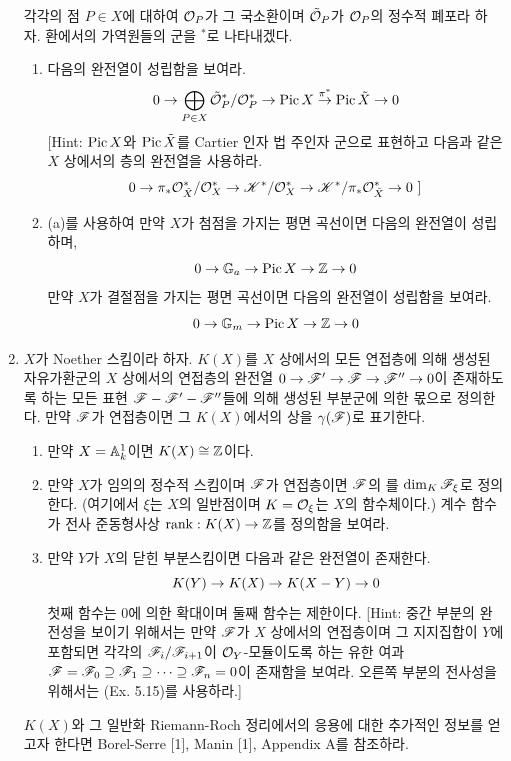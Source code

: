 \begin{enumerate}[label=\tb{6.\arabic*.},itemindent=0mm,itemsep=4mm]
{	각각의 점 $P\in X$에 대하여 $\mathcal{O}_P$가 그 국소환이며 $\tilde{\mathcal{O}}_P$가 $\mathcal{O}_P$의 정수적 폐포라 하자.
	환에서의 가역원들의 군을 ${}^*$로 나타내겠다.
	\begin{enumerate}[label=(\alph*)]
	\item 다음의 완전열이 성립함을 보여라.
	$$0\rightarrow\bigoplus_{P\in X}\tilde{\mathcal{O}}_P^*/\mathcal{O}_P^*\rightarrow\operatorname{Pic} X\stackrel{\pi^*}{\rightarrow}\operatorname{Pic}\tilde X\rightarrow 0$$
	[Hint: $\operatorname{Pic} X$와 $\operatorname{Pic}\tilde X$를 Cartier 인자 법 주인자 군으로 표현하고 다음과 같은 $X$ 상에서의 층의 완전열을 사용하라.
	$$0\rightarrow\pi_*\mathcal{O}_{\tilde X}^*/\mathcal{O}_X^*\rightarrow\mathscr{K}^*/\mathcal{O}_X^*\rightarrow\mathscr{K}^*/\pi_*\mathcal{O}_{\tilde X}^*\rightarrow 0\text{ ]}$$
	\item (a)를 사용하여 만약 $X$가 첨점을 가지는 평면 곡선이면 다음의 완전열이 성립하며,
	$$0\rightarrow\mathbb{G}_a\rightarrow\operatorname{Pic} X\rightarrow\mathbb Z\rightarrow 0$$
	만약 $X$가 결절점을 가지는 평면 곡선이면 다음의 완전열이 성립함을 보여라.
	$$0\rightarrow\mathbb{G}_m\rightarrow\operatorname{Pic} X\rightarrow\mathbb Z\rightarrow 0$$
	\end{enumerate}}
	\item {} $X$가 Noether 스킴이라 하자. $K(X)$를 $X$ 상에서의 모든 연접층에 의해 생성된 자유가환군의
	$X$ 상에서의 연접층의 완전열 $0\rightarrow\mathscr{F}'\rightarrow\mathscr{F}\rightarrow\mathscr{F}''\rightarrow 0$이 존재하도록 하는
	모든 표현 $\mathscr{F}-\mathscr{F}'-\mathscr{F}''$들에 의해 생성된 부분군에 의한 몫으로 정의한다.
	만약 $\mathscr{F}$가 연접층이면 그 $K(X)$에서의 상을 $\gamma(\mathscr{F})$로 표기한다.
	\begin{enumerate}[label=(\alph*)]
	\item 만약 $X=\mathbb{A}_k^1$이면 $K(X)\cong\mathbb Z$이다.
	\item 만약 $X$가 임의의 정수적 스킴이며 $\mathscr{F}$가 연접층이면 $\mathscr{F}$의 를 $\dim_K\mathscr{F}_\xi$로 정의한다.
	(여기에서 $\xi$는 $X$의 일반점이며 $K=\mathcal{O}_\xi$는 $X$의 함수체이다.)
	계수 함수가 전사 준동형사상 $\mathrm{rank}:K(X)\rightarrow\mathbb Z$를 정의함을 보여라.
	\item 만약 $Y$가 $X$의 닫힌 부분스킴이면 다음과 같은 완전열이 존재한다.
	$$K(Y)\rightarrow K(X)\rightarrow K(X-Y)\rightarrow 0$$
	첫째 함수는 0에 의한 확대이며 둘째 함수는 제한이다.
	[Hint: 중간 부분의 완전성을 보이기 위해서는 만약 $\mathscr{F}$가 $X$ 상에서의 연접층이며 그 지지집합이 $Y$에 포함되면
	각각의 $\mathscr{F}_i/\mathscr{F}_{i+1}$이 $\mathcal{O}_Y$-모듈이도록 하는
	유한 여과 $\mathscr{F}=\mathscr{F}_0\supseteq\mathscr{F}_1\supseteq\cdots\supseteq\mathscr{F}_n=0$이 존재함을 보여라.
	오른쪽 부분의 전사성을 위해서는 (Ex. 5.15)를 사용하라.]
	\end{enumerate}
	$K(X)$와 그 일반화 Riemann-Roch 정리에서의 응용에 대한 추가적인 정보를 얻고자 한다면
	Borel-Serre [1], Manin [1], Appendix A를 참조하라.
	{\renewcommand{\labelenumi}{\tb{*6.\arabic{enumi}.}}
}
\end{enumerate}
